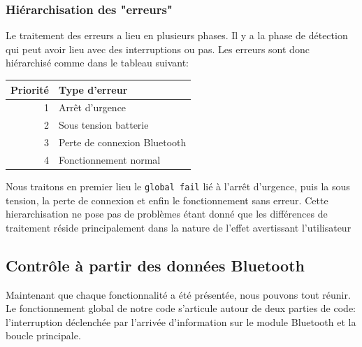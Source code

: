 				\subsubsection{Hiérarchisation des "erreurs"}
				Le traitement des erreurs a lieu en plusieurs phases. Il y a la phase de détection qui peut avoir lieu avec des interruptions ou pas. Les erreurs sont donc hiérarchisé comme dans le tableau suivant:
				\begin{table}
				\begin{center}
					\begin{tabular}{r|l}
					Priorité&Type d'erreur\\
					\hline
					 1 & Arrêt d'urgence 	\\ 
					 2 & Sous tension batterie 	\\ 
					 3 & Perte de connexion Bluetooth	\\
					 4 & Fonctionnement normal	\\
					\end{tabular} 
					\end{center}
				\end{table}
				Nous traitons en premier lieu le \texttt{global fail} lié à l'arrêt d'urgence, puis la sous tension, la perte de connexion et enfin le fonctionnement sans erreur. Cette hierarchisation ne pose pas de problèmes étant donné que les différences de traitement réside principalement dans la nature de l'effet avertissant l'utilisateur
			\subsection{Contrôle à partir des données Bluetooth}
			Maintenant que chaque fonctionnalité a été présentée, nous pouvons tout réunir. Le fonctionnement global de notre code s'articule autour de deux parties de code: l'interruption déclenchée par l'arrivée d'information sur le module Bluetooth et la boucle principale.
